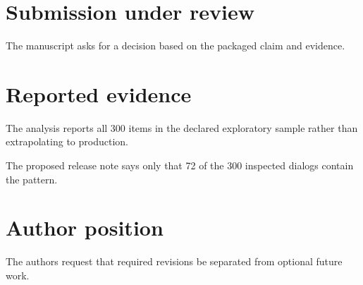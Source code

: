 \documentclass{article}
\begin{document}
\section{Submission under review}
The manuscript asks for a decision based on the packaged claim and evidence.
\section{Reported evidence}
The analysis reports all 300 items in the declared exploratory sample rather than extrapolating to production.

The proposed release note says only that 72 of the 300 inspected dialogs contain the pattern.
\section{Author position}
The authors request that required revisions be separated from optional future work.
\end{document}
